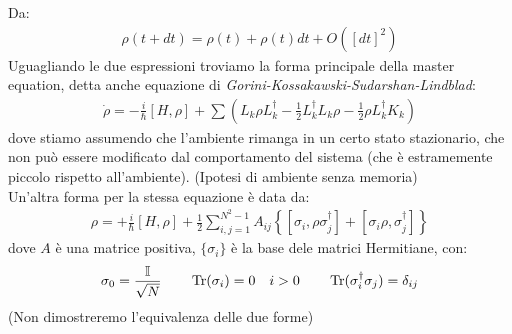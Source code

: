 \documentclass[../../InformazioneQuantistica.tex]{subfiles}
\begin{document}
Da:
\begin{align*}
\rho(t+dt) = \rho(t) + \rho(t)dt + O([dt]^2)
\end{align*}
Uguagliando le due espressioni troviamo la forma principale della master equation, detta anche equazione di \textit{Gorini-Kossakawski-Sudarshan-Lindblad}:
\begin{align*}
\dot{\rho} = -\frac{i}{\hbar}[H,\rho] + \sum \left(L_k \rho L_k^\dag - \frac{1}{2}L_k^\dag L_k\rho - \frac{1}{2}\rho L_k^\dag K_k\right)
\end{align*}
dove stiamo assumendo che l'ambiente rimanga in un certo stato stazionario, che non può essere modificato dal comportamento del sistema (che è estramemente piccolo rispetto all'ambiente). (Ipotesi di ambiente senza memoria)\\

Un'altra forma per la stessa equazione è data da:
\begin{align*}
\rho = +\frac{i}{\hbar}[H,\rho] + \frac{1}{2}\sum_{i,j=1}^{N^2-1} A_{ij}\left\{[\sigma_i, \rho\sigma_j^\dag] + [\sigma_i\rho, \sigma_j^\dag]\right\}
\end{align*}
dove $A$ è una matrice positiva, $\{\sigma_i\}$ è la base dele matrici Hermitiane, con:
\begin{align*}
\sigma_0 = \frac{\mathbb{I}}{\sqrt{N}} \qquad \operatorname{Tr}(\sigma_i)=0 \quad i > 0 \qquad \operatorname{Tr}(\sigma_i^\dag \sigma_j) = \delta_{ij}
\end{align*}
(Non dimostreremo l'equivalenza delle due forme)\\
\end{document}

